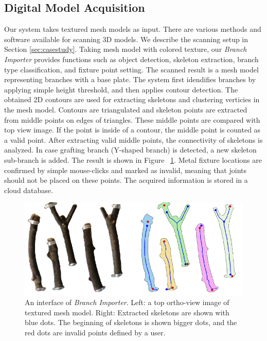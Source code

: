 \subsection{Digital Model Acquisition}
Our system takes textured mesh models as input.
There are various methods and software available for scanning 3D models.
We describe the scanning setup in Section \ref{sec:casestudy}.
Taking mesh model with colored texture, our \textit{Branch Importer} provides functions such as object detection, skeleton extraction, branch type classification, and fixture point setting.
The scanned result is a mesh model representing branches with a base plate.
The system first idendifies branches by applying simple height threshold, and then applies contour detection.
The obtained 2D contours are used for extracting skeletons and clustering verticies in the mesh model.
Contours are triangulated and skeleton points are extracted from middle points on edges of triangles.
These middle points are compared with top view image.
If the point is inside of a contour, the middle point is counted as a valid point.
After extracting valid middle points, the connectivity of skeletons is analyzed.
In case grafting branch (Y-shaped branch) is detected, a new skeleton sub-branch is added.
The result is shown in Figure ~\ref{fig:skeleton}.
Metal fixture locations are confirmed by simple mouse-clicks and marked as invalid, meaning that joints should not be placed on these points.
The acquired information is stored in a cloud database.

\begin{figure}[ht]
  \includegraphics[width = 0.4\paperwidth]{images/importer/importer.png}
  \caption{An interface of \textit{Branch Importer}. Left: a top ortho-view image of textured mesh model. Right: Extracted skeletons are shown with blue dots. The beginning of skeletons is shown bigger dots, and the red dots are invalid points defined by a user. }
  \label{fig:skeleton}
\end{figure}


